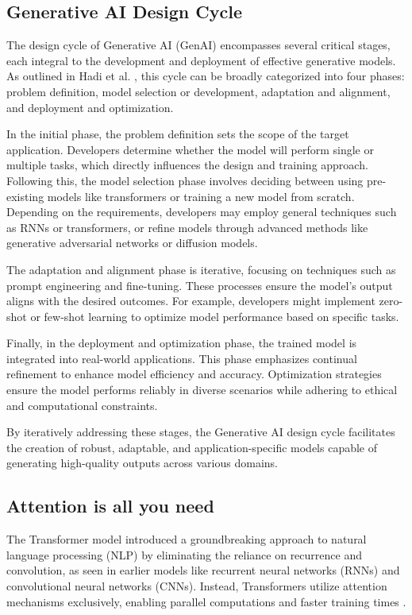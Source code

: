 \subsection{Generative AI Design Cycle}
The design cycle of Generative AI (GenAI) encompasses several critical stages, each integral to the development and deployment of effective generative models. As outlined in Hadi et al. \cite{hadi2024}, this cycle can be broadly categorized into four phases: problem definition, model selection or development, adaptation and alignment, and deployment and optimization.

In the initial phase, the problem definition sets the scope of the target application. Developers determine whether the model will perform single or multiple tasks, which directly influences the design and training approach. Following this, the model selection phase involves deciding between using pre-existing models like transformers or training a new model from scratch. Depending on the requirements, developers may employ general techniques such as RNNs or transformers, or refine models through advanced methods like generative adversarial networks or diffusion models.

The adaptation and alignment phase is iterative, focusing on techniques such as prompt engineering and fine-tuning. These processes ensure the model's output aligns with the desired outcomes. For example, developers might implement zero-shot or few-shot learning to optimize model performance based on specific tasks.

Finally, in the deployment and optimization phase, the trained model is integrated into real-world applications. This phase emphasizes continual refinement to enhance model efficiency and accuracy. Optimization strategies ensure the model performs reliably in diverse scenarios while adhering to ethical and computational constraints.

By iteratively addressing these stages, the Generative AI design cycle facilitates the creation of robust, adaptable, and application-specific models capable of generating high-quality outputs across various domains.
\subsection{Attention is all you need}
The Transformer model introduced a groundbreaking approach to natural language processing (NLP) by eliminating the reliance on recurrence and convolution, as seen in earlier models like recurrent neural networks (RNNs) and convolutional neural networks (CNNs). Instead, Transformers utilize attention mechanisms exclusively, enabling parallel computations and faster training times \cite{vaswani2017attention}.


